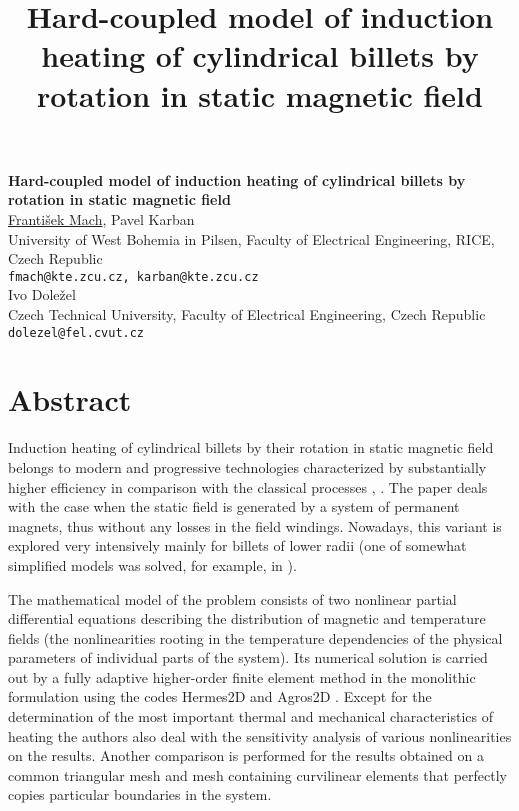\title{Hard-coupled model of induction heating of cylindrical billets by rotation in static magnetic field}
\author{} \institute{}
\tocauthor{}

\begin{center}

\textbf{\Large Hard-coupled model of induction heating of cylindrical billets by rotation in static magnetic field}\\
\vspace{10mm}
{\large \underline{Franti\v{s}ek Mach}, Pavel Karban}\\
University of West Bohemia in Pilsen, Faculty of Electrical Engineering, RICE,
Czech Republic\\
{\tt fmach@kte.zcu.cz, karban@kte.zcu.cz}\\
\vspace{4mm}
{\large Ivo Dole\v{z}el}\\
Czech Technical University, Faculty of Electrical Engineering,
Czech Republic\\
{\tt dolezel@fel.cvut.cz}

\end{center}

\section*{Abstract}

Induction heating of cylindrical billets by their rotation in static magnetic field belongs to modern and progressive technologies characterized by substantially higher efficiency in comparison with the classical processes \cite{UIE1}, \cite{UIE2}. The paper deals with the case when the static field is generated by a system of permanent magnets, thus without any losses in the field windings. Nowadays, this variant is explored very intensively mainly for billets of lower radii (one of somewhat simplified models was solved, for example, in \cite{HES}).

The mathematical model of the problem consists of two nonlinear partial differential equations describing the distribution of magnetic and temperature fields (the nonlinearities rooting in the temperature dependencies of the physical parameters of individual parts of the system). Its numerical solution is carried out by a fully adaptive higher-order finite element method in the monolithic formulation using the codes Hermes2D and Agros2D \cite{Hermes2D}. Except for the determination of the most important thermal and mechanical characteristics of heating the authors also deal with the sensitivity analysis of various nonlinearities on the results. Another comparison is performed for the results obtained on a common triangular mesh and mesh containing curvilinear elements that perfectly copies particular boundaries in the system.

